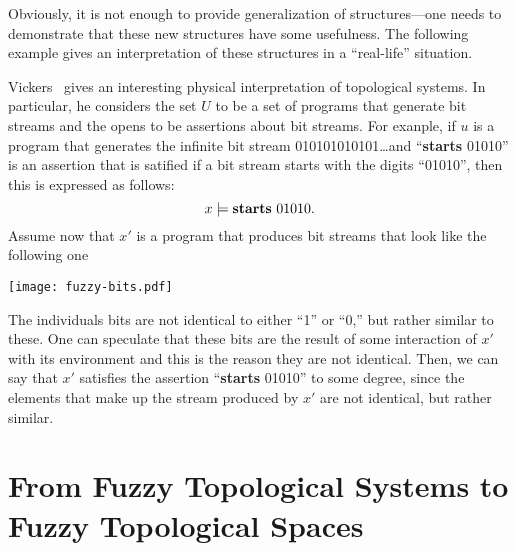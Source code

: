 \documentclass[11pt]{article}
\newenvironment{example}[1][Example]{\begin{trivlist}
\item[\hskip \labelsep {\bfseries #1}]}{\end{trivlist}}
\begin{document}
Obviously, it is not enough to provide generalization of structures---one needs to
demonstrate that these new structures have some usefulness. The following example
gives an interpretation of these structures in a ``real-life'' situation.
\begin{example}
Vickers~\cite[p.~53]{vickers90} gives an interesting physical interpretation of 
topological systems. In particular, he considers the set $U$ to be a set of programs 
that generate bit streams and the opens to be assertions about bit streams. For exanple, 
if $u$ is a program that generates the infinite bit stream 010101010101\ldots and 
``\textbf{starts} 01010'' is an assertion that is satified if a bit stream starts 
with the digits ``01010'', then this is expressed as follows: 
\begin{displaymath}
x\models \text{\textbf{starts} 01010}.
\end{displaymath}
Assume now that $x'$ is a program that produces bit streams that look like the following one
\begin{center}
\texttt{[image: fuzzy-bits.pdf]}
\end{center}
The individuals bits are not identical to either ``1'' or ``0,'' but rather similar 
to these. One can speculate that these bits are the result of some interaction of 
$x'$ with its environment and this is the reason they are not identical. Then, we can 
say that $x'$ satisfies the assertion ``\textbf{starts} 01010'' to some degree, since 
the elements that make up the stream produced by $x'$ are not identical, but rather similar.
\end{example}
\section{From Fuzzy Topological Systems to Fuzzy Topological Spaces}
\end{document}
